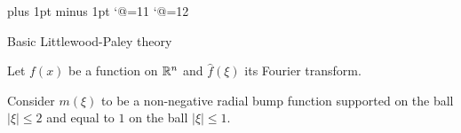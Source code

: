 
\parskip 3pt plus 1pt minus 1pt
\hfuzz 0.5cm
\baselineskip 13pt
\NoBlackBoxes
{\catcode`@=11
\gdef\nologo{\let\logo@\empty}
\catcode`@=12}
\nologo



\def \f {\frac}
\def \cS {{\Cal S}}
\def \bu {\bullet}
\def\card{\operatorname{card}}
\def\intinfin{\int_{-\infty}^{\infty}}
\def\const{\operatorname{const.}}
\def\dist{\operatorname{dist}}
\def\supp{\operatorname{supp}}
\def\sign{{\rm sgn}}
\def\conpsi{{\text const}_{\psi}}
\def\A{{\Cal A}}
\def\B{{\Cal B}}
\def\C{{\Cal C}}
\def\D{{\Cal D}}
\def\E{{\Cal E}}
\def\F{{\Cal F}}
\def\G{{\Cal G}}
\def\H{{\Cal H}}
\def\I{{\Cal I}}
\def\J{{\Cal J}}
\def\K{{\Cal K}}
\def\L{{\Cal L}}
\def\M{{\Cal M}}
\def\N{{\Cal N}}
\def\Q{{\Cal Q}}
\def\P{{\Cal P}}
\def\R{{\Cal R}}
\def\S{{\Cal S}}
\def\T{{\Cal T}}
\def\V{{\Cal V}}
\def\W{{\Cal W}}
\def\IC{{\Bbb C}}
\def\IH{{\Bbb H}}
\def\II{{\Bbb I}}
\def\IJ{{\Bbb J}}
\def\IN{{\Bbb N}}
\def\IP{{\Bbb P}}
\def\IQ{{\Bbb Q}}
\def\IR{{\Bbb R}} 
\def\IS{{\Bbb S}}
\def\real{{\Bbb R}}
\def\IT{{\Bbb T}}
\def\IW{{\Bbb W}}
\def\IZ{{\Bbb Z}}
\def\zed{{\Bbb Z}}
\def\tee{{\Bbb T}}

\def\gA{{\frak A}}
\def\gB{{\frak B}}
\def\gF{{\frak F}}
\def\gG{{\frak G}}
\def\gH{{\frak H}}
\def\gN{{\frak N}}
\def\gP{{\frak P}}
\def\gT{{\frak T}}
\def \gg{{\frak g}}
\def\nat{{\Bbb N}}
\def\que{{\Bbb Q}}
\def\real{{\Bbb R}}
\def \tq {{\tilde q}}
\def \tp {{\tilde p}}
\def\so{\text{\rm SO}}
\def \inv {|\nabla|^{-1}}
\def\bR{\text{\bf R}}

\overfullrule=0pt

\def\varep{\varepsilon}
\def\ch{\raise 0.3ex\hbox{$\chi$}\kern-.15em}


\def\lto{\longrightarrow}

\def\conj{\overline}

\def\myskip{\noalign{\vskip5pt}}

\def\bmatrix#1{\left[ \matrix #1\endmatrix \right]}






\subhead Basic Littlewood-Paley theory \endsubhead


Let $f(x)$ be a function on $\IR^n$ and $\hat{f}(\xi)$ its Fourier transform.


Consider $m(\xi)$ to be a non-negative radial bump function supported on the ball 
$|\xi |\leq 2$ and equal to $1$ on the ball $|\xi| \leq 1$. 


